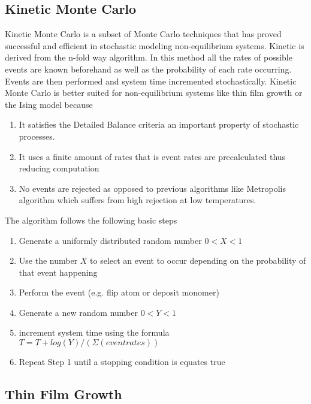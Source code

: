 \subsection{Kinetic Monte Carlo}

Kinetic Monte Carlo is a subset of Monte Carlo techniques that has proved successful and efficient in stochastic modeling non-equilibrium systems. Kinetic is derived from the n-fold way algorithm. In this method all the rates of possible events are known beforehand as well as the probability of each rate occurring. Events are then performed and system time incremented stochastically.
Kinetic Monte Carlo is better suited for non-equilibrium systems like thin film growth or the Ising model because
\begin{enumerate}
\item It satisfies the Detailed Balance criteria an important property of stochastic processes.
\item It uses a finite amount of rates that is event rates are precalculated thus reducing computation
\item No events are rejected as opposed to previous algorithms like Metropolis algorithm which suffers from high rejection at low temperatures.
\end{enumerate}

The algorithm follows the following basic steps
\begin{enumerate}
\item Generate a uniformly distributed random number $0<X<1$
\item Use the number $X$ to select an event to occur depending on the probability of that event happening
\item Perform the event (e.g. flip atom or deposit monomer)
\item Generate a new random number $0<Y<1$
\item increment system time using the formula $T=T + log(Y)/(Σ(event rates))$
\item Repeat Step 1 until a stopping condition is equates true
\end{enumerate}

\subsection{Thin Film Growth}
\label{section:Thin Film Growth}

